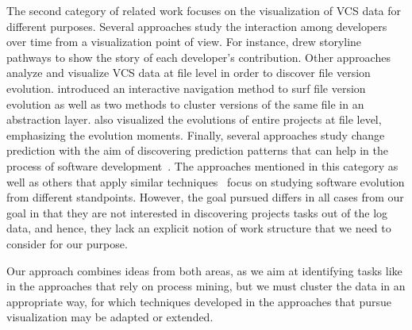 The second category of related work focuses on the visualization of VCS data %
for different purposes.
Several approaches study the interaction among developers over time from a visualization point of view. For instance, \cite{ogawa2010software} drew storyline pathways to show the story of each developer's contribution. Other approaches analyze and visualize VCS data at file level in order to discover file version evolution. \cite{voinea_multiscale_2006} introduced an interactive navigation method to surf file version evolution as well as two methods to cluster versions of the same file in an abstraction layer. \cite{jingwei_evolution_2004} also visualized the evolutions of entire projects at file level, emphasizing the evolution moments.
Finally, several approaches study change prediction with the aim of discovering prediction patterns that can help in the process of software development~\citep{DBLP:journals/tse/ZimmermannWDZ05,ying_predicting_2004}.
The approaches mentioned in this category as well as others that apply similar techniques~\citep{feldt2013supporting,kagdi_mining_2006,dambros_flexible_2008} focus on studying software evolution from different standpoints. However, the goal pursued differs in all cases from our goal in that they are not interested in discovering projects tasks out of the log data, and hence, they lack an explicit notion of work structure that we need to consider for our purpose.

Our approach combines ideas from both areas, as we aim at identifying tasks like in the approaches that rely on process mining, but we must cluster the data in an appropriate way, for which techniques developed in the approaches that pursue visualization may be adapted or extended.

%
